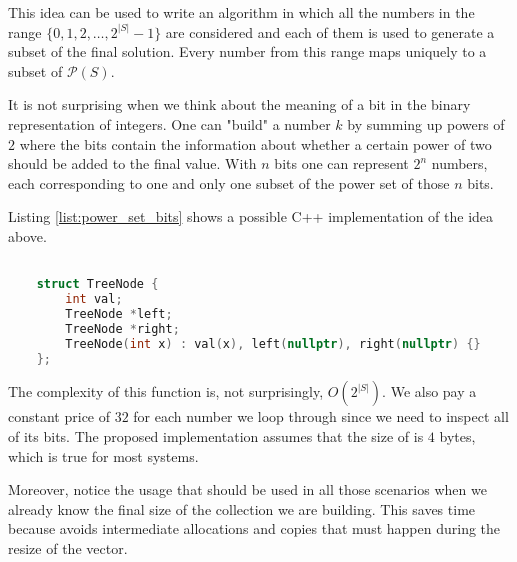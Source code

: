 This idea can be used to write an algorithm in which all the numbers in the range $\{0,1,2,\ldots,
2^{|S|}-1\}$ are considered and each of them is used to generate a subset of the final solution.
Every number from this range maps uniquely to a subset of $\mathcal{P}(S)$. 

It is not
surprising when we think about the meaning of a bit in the binary representation of integers. One
can "build" a number $k$ by summing up powers of $2$ where the bits contain the information about whether a
certain power of two should be added to the final value. With $n$
bits one can represent $2^n$ numbers, each corresponding to one and only one subset of the power set of those $n$ bits.


Listing \ref{list:power_set_bits} shows  a possible C++ implementation of the idea above.


\begin{lstlisting}[language=c++, caption=Binary tree definition used in this exercice.,label=list:verify_BST:tree_structure]

    struct TreeNode {
        int val;
        TreeNode *left;
        TreeNode *right;
        TreeNode(int x) : val(x), left(nullptr), right(nullptr) {}
    };
    \end{lstlisting}


The complexity of this function is, not surprisingly, $O(2^{|S|})$. 
We also pay a constant price of $32$ for each number we loop through since we need to inspect all of its bits.
The proposed implementation assumes that the size of  is $4$ bytes, 
which is true for most systems.

Moreover, notice the usage 
that should be used in all those scenarios when we already know the final size of the
collection we are building. This saves time because avoids intermediate allocations and copies that must happen during the resize of the vector.







